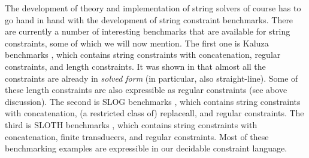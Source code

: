 The development of theory and implementation of string solvers of course
has to go hand in hand with the development of string constraint benchmarks.
There are currently a number of interesting benchmarks that are available for 
string constraints, some of which we will now mention. The first one is Kaluza 
benchmarks
\cite{Berkeley-JavaScript}, which contains
string constraints with concatenation, regular constraints, and length
constraints. It was shown in \cite{Vijay-length}
that almost all the constraints are already in
\emph{solved form} (in particular, also straight-line). Some of these length
constraints are also expressible as regular constraints (see above discussion).
The second is SLOG benchmarks \cite{fang-yu-circuits}, which contains
string constraints with concatenation, (a restricted class of) replaceall, and 
regular constraints. The third is SLOTH benchmarks \cite{HJLRV18}, which
contains string constraints with concatenation, finite transducers, and
regular constraints. Most of these benchmarking examples are expressible in our
decidable constraint language.



